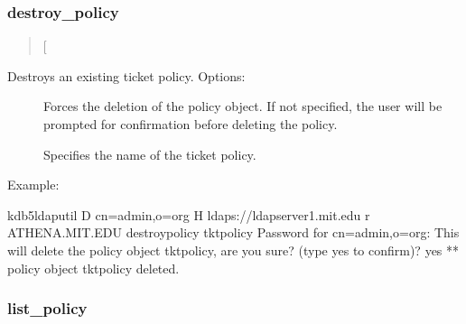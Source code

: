 \documentclass[letterpaper,10pt,english]{sphinxmanual}
\begin{document}
\subsubsection{destroy\_policy}
\label{\detokenize{admin/admin_commands/kdb5_ldap_util:destroy-policy}}\label{\detokenize{admin/admin_commands/kdb5_ldap_util:kdb5-ldap-util-view-policy-end}}\label{\detokenize{admin/admin_commands/kdb5_ldap_util:kdb5-ldap-util-destroy-policy}}\begin{quote}

{[}\sphinxstylestrong{-force}{]}
\end{quote}

Destroys an existing ticket policy.  Options:
\begin{description}
\item[{}] \leavevmode
Forces the deletion of the policy object.  If not specified, the
user will be prompted for confirmation before deleting the policy.

\item[{}] \leavevmode
Specifies the name of the ticket policy.

\end{description}

Example:

%
\begin{sphinxVerbatim}[commandchars=\\\{\}]
kdb5\PYGZus{}ldap\PYGZus{}util \PYGZhy{}D cn=admin,o=org \PYGZhy{}H ldaps://ldap\PYGZhy{}server1.mit.edu
    \PYGZhy{}r ATHENA.MIT.EDU destroy\PYGZus{}policy tktpolicy
Password for \PYGZdq{}cn=admin,o=org\PYGZdq{}:
This will delete the policy object \PYGZsq{}tktpolicy\PYGZsq{}, are you sure?
(type \PYGZsq{}yes\PYGZsq{} to confirm)? yes
** policy object \PYGZsq{}tktpolicy\PYGZsq{} deleted.
\end{sphinxVerbatim}


\subsubsection{list\_policy}
\label{\detokenize{admin/admin_commands/kdb5_ldap_util:list-policy}}\label{\detokenize{admin/admin_commands/kdb5_ldap_util:kdb5-ldap-util-destroy-policy-end}}\label{\detokenize{admin/admin_commands/kdb5_ldap_util:kdb5-ldap-util-list-policy}}\begin{quote}

\end{quote}
\end{document}
